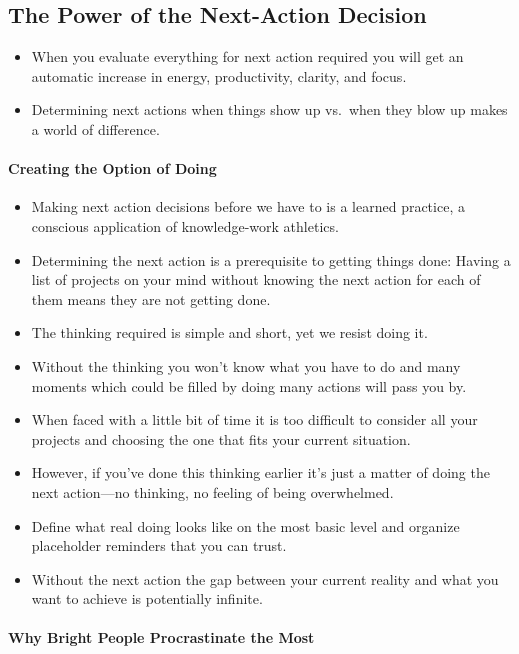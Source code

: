 \documentclass{article}
\begin{document}
\subsection{The Power of the Next-Action Decision}

\begin{itemize}
 \item When you evaluate everything for next action required you will get an automatic increase in energy, productivity, clarity, and focus.
 \item Determining next actions when things show up vs.\ when they blow up makes a world of difference.
\end{itemize}

\paragraph{Creating the Option of Doing}

\begin{itemize}
 \item Making next action decisions before we have to is a learned practice, a conscious application of knowledge-work athletics.
 \item Determining the next action is a prerequisite to getting things done: Having a list of projects on your mind without knowing the next action for each of them means they are not getting done.
 \item The thinking required is simple and short, yet we resist doing it.
 \item Without the thinking you won't know what you have to do and many moments which could be filled by doing many actions will pass you by.
 \item When faced with a little bit of time it is too difficult to consider all your projects and choosing the one that fits your current situation.
 \item However, if you've done this thinking earlier it's just a matter of doing the next action---no thinking, no feeling of being overwhelmed.
 \item Define what real doing looks like on the most basic level and organize placeholder reminders that you can trust.
 \item Without the next action the gap between your current reality and what you want to achieve is potentially infinite.
\end{itemize}

\paragraph{Why Bright People Procrastinate the Most}
\end{document}
